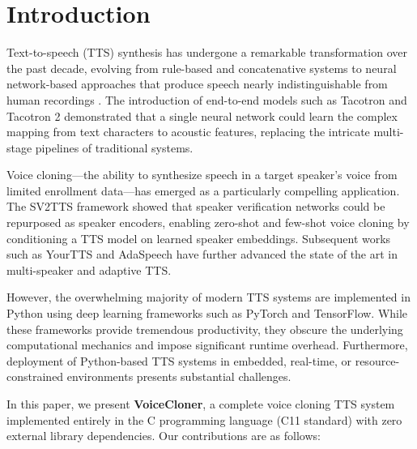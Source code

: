 \documentclass[conference]{IEEEtran}
\begin{document}
\section{Introduction}

Text-to-speech (TTS) synthesis has undergone a remarkable transformation over the past decade, evolving from rule-based and concatenative systems \cite{taylor2009text, zen2009statistical} to neural network-based approaches that produce speech nearly indistinguishable from human recordings \cite{wang2017tacotron, shen2018tacotron2, oord2016wavenet}. The introduction of end-to-end models such as Tacotron \cite{wang2017tacotron} and Tacotron 2 \cite{shen2018tacotron2} demonstrated that a single neural network could learn the complex mapping from text characters to acoustic features, replacing the intricate multi-stage pipelines of traditional systems.

Voice cloning—the ability to synthesize speech in a target speaker's voice from limited enrollment data—has emerged as a particularly compelling application. The SV2TTS framework \cite{jia2018transfer} showed that speaker verification networks could be repurposed as speaker encoders, enabling zero-shot and few-shot voice cloning by conditioning a TTS model on learned speaker embeddings. Subsequent works such as YourTTS \cite{casanova2022yourtts} and AdaSpeech \cite{chen2021adaspeech} have further advanced the state of the art in multi-speaker and adaptive TTS.

However, the overwhelming majority of modern TTS systems are implemented in Python using deep learning frameworks such as PyTorch and TensorFlow. While these frameworks provide tremendous productivity, they obscure the underlying computational mechanics and impose significant runtime overhead. Furthermore, deployment of Python-based TTS systems in embedded, real-time, or resource-constrained environments presents substantial challenges.

In this paper, we present \textbf{VoiceCloner}, a complete voice cloning TTS system implemented entirely in the C programming language (C11 standard) with zero external library dependencies. Our contributions are as follows:
\end{document}
